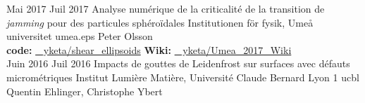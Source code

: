 \documentclass[letterpaper]{cvtemplate_fr} %
\begin{document}
\begin{cvbody}
\cvitem
	{Mai 2017}
	{Juil 2017}
	{Analyse num\'erique de la criticalit\'e de la transition de \textit{jamming} pour des particules sph\'ero\"idales}
	{Institutionen f\"{o}r fysik, Ume\r{a} universitet }
	{umea.eps}
	{Peter Olsson}
	{\\
	{\bf code:} \href{https://github.com/yketa/shear_ellipsoids}{\faGithub~ yketa/shear\_ellipsoids} \hfill {\bf Wiki:} \href{https://yketa.github.io/Umea_2017_Wiki}{\faGithub~ yketa/Umea\_2017\_Wiki}
	}
  \\

\cvitem
	{Juin 2016}
	{Juil 2016}
	{Impacts de gouttes de Leidenfrost sur surfaces avec d\'efauts microm\'etriques}
	{Institut Lumi\`ere Mati\`ere, Universit\'e Claude Bernard Lyon 1 }
	{ucbl}
	{Quentin Ehlinger, Christophe Ybert}

\end{cvbody}

\end{document}
